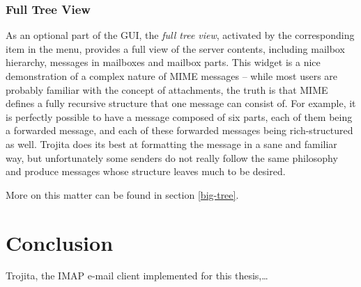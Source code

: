 \documentclass[12pt,notitlepage]{report}
\newcommand{\trojita}{Trojita\xspace}
\begin{document}
\subsection{Full Tree View}

As an optional part of the GUI, the {\em full tree view}, activated by the
corresponding item in the menu, provides a full view of the server contents,
including mailbox hierarchy, messages in mailboxes and mailbox parts.  This
widget is a nice demonstration of a complex nature of MIME messages -- while
most users are probably familiar with the concept of attachments, the truth is
that MIME defines a fully recursive structure that one message can consist of.
For example, it is perfectly possible to have a message composed of six parts,
each of them being a forwarded message, and each of these forwarded messages
being rich-structured as well.  \trojita does its best at formatting the message
in a sane and familiar way, but unfortunately some senders do not really follow
the same philosophy and produce messages whose structure leaves much to be
desired.

More on this matter can be found in section \ref{big-tree}.

\chapter{Conclusion}

\trojita, the IMAP e-mail client implemented for this thesis,\ldots
\end{document}
